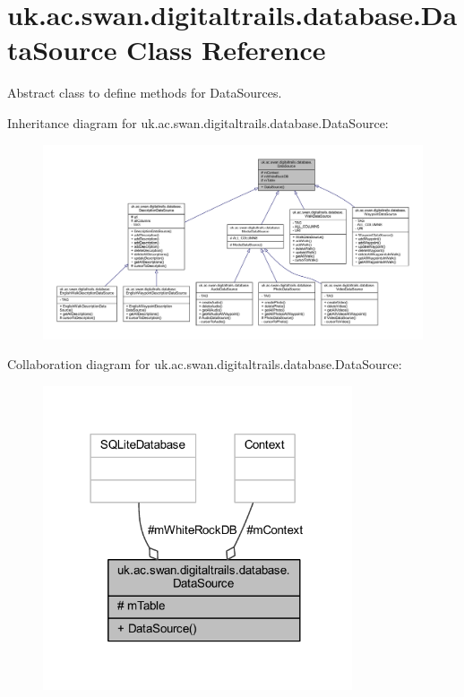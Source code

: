 \hypertarget{classuk_1_1ac_1_1swan_1_1digitaltrails_1_1database_1_1_data_source}{\section{uk.\+ac.\+swan.\+digitaltrails.\+database.\+Data\+Source Class Reference}
\label{classuk_1_1ac_1_1swan_1_1digitaltrails_1_1database_1_1_data_source}
}


Abstract class to define methods for Data\+Sources.  




Inheritance diagram for uk.\+ac.\+swan.\+digitaltrails.\+database.\+Data\+Source\+:
\nopagebreak
\begin{figure}[H]
\begin{center}
\leavevmode
\includegraphics[width=350pt]{classuk_1_1ac_1_1swan_1_1digitaltrails_1_1database_1_1_data_source__inherit__graph}
\end{center}
\end{figure}


Collaboration diagram for uk.\+ac.\+swan.\+digitaltrails.\+database.\+Data\+Source\+:
\nopagebreak
\begin{figure}[H]
\begin{center}
\leavevmode
\includegraphics[width=259pt]{classuk_1_1ac_1_1swan_1_1digitaltrails_1_1database_1_1_data_source__coll__graph}
\end{center}
\end{figure}
